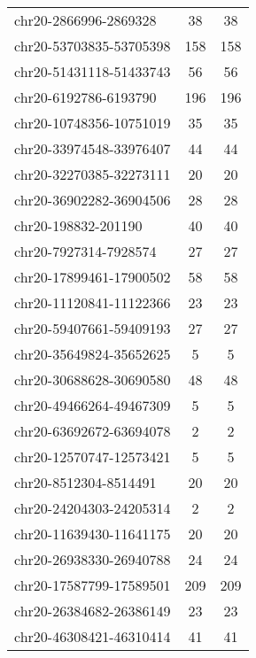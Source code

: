 \begin{longtable}{lSS}
	chr20-2866996-2869328   & 38     & 38                         \\
	chr20-53703835-53705398 & 158    & 158                        \\
	chr20-51431118-51433743 & 56     & 56                         \\
	chr20-6192786-6193790   & 196    & 196                        \\
	chr20-10748356-10751019 & 35     & 35                         \\
	chr20-33974548-33976407 & 44     & 44                         \\
	chr20-32270385-32273111 & 20     & 20                         \\
	chr20-36902282-36904506 & 28     & 28                         \\
	chr20-198832-201190     & 40     & 40                         \\
	chr20-7927314-7928574   & 27     & 27                         \\
	chr20-17899461-17900502 & 58     & 58                         \\
	chr20-11120841-11122366 & 23     & 23                         \\
	chr20-59407661-59409193 & 27     & 27                         \\
	chr20-35649824-35652625 & 5      & 5                          \\
	chr20-30688628-30690580 & 48     & 48                         \\
	chr20-49466264-49467309 & 5      & 5                          \\
	chr20-63692672-63694078 & 2      & 2                          \\
	chr20-12570747-12573421 & 5      & 5                          \\
	chr20-8512304-8514491   & 20     & 20                         \\
	chr20-24204303-24205314 & 2      & 2                          \\
	chr20-11639430-11641175 & 20     & 20                         \\
	chr20-26938330-26940788 & 24     & 24                         \\
	chr20-17587799-17589501 & 209    & 209                        \\
	chr20-26384682-26386149 & 23     & 23                         \\
	chr20-46308421-46310414 & 41     & 41                         \\

\end{longtable}
